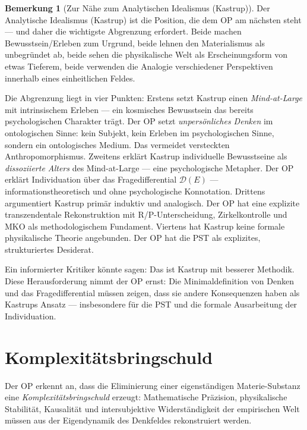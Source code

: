 \documentclass[11pt,a4paper]{article}
\theoremstyle{plain}
\theoremstyle{definition}
\newtheorem{remark}{Bemerkung}[section]
\begin{document}
\begin{remark}[Zur N\"{a}he zum Analytischen Idealismus (Kastrup)]
Der Analytische Idealismus (Kastrup) ist die Position, die dem OP am n\"{a}chsten steht
--- und daher die wichtigste Abgrenzung erfordert. Beide machen Bewusstsein/Erleben zum
Urgrund, beide lehnen den Materialismus als unbegr\"{u}ndet ab, beide sehen die
physikalische Welt als Erscheinungsform von etwas Tieferem, beide verwenden die Analogie
verschiedener Perspektiven innerhalb eines einheitlichen Feldes.

Die Abgrenzung liegt in vier Punkten: Erstens setzt Kastrup einen \emph{Mind-at-Large}
mit intrinsischem Erleben --- ein kosmisches Bewusstsein das bereits psychologischen
Charakter tr\"{a}gt. Der OP setzt \emph{unpersönliches Denken} im ontologischen Sinne:
kein Subjekt, kein Erleben im psychologischen Sinne, sondern ein ontologisches Medium.
Das vermeidet versteckten Anthropomorphismus. Zweitens erkl\"{a}rt Kastrup individuelle
Bewusstseine als \emph{dissoziierte Alters} des Mind-at-Large --- eine psychologische
Metapher. Der OP erkl\"{a}rt Individuation \"{u}ber das Fragedifferential $\mathcal{D}(E)$
--- informationstheoretisch und ohne psychologische Konnotation. Drittens argumentiert
Kastrup prim\"{a}r induktiv und analogisch. Der OP hat eine explizite transzendentale
Rekonstruktion mit R/P-Unterscheidung, Zirkelkontrolle und MKO als methodologischem
Fundament. Viertens hat Kastrup keine formale physikalische Theorie angebunden. Der OP
hat die PST als explizites, strukturiertes Desiderat.

Ein informierter Kritiker k\"{o}nnte sagen: \glqq{}Das ist Kastrup mit besserer
Methodik.\grqq{} Diese Herausforderung nimmt der OP ernst: Die Minimaldefinition von
\glqq{}Denken\grqq{} und das Fragedifferential m\"{u}ssen zeigen, dass sie andere
Konsequenzen haben als Kastrups Ansatz --- insbesondere f\"{u}r die PST und die formale
Ausarbeitung der Individuation.
\end{remark}

\section{Komplexit\"{a}tsbringschuld}

Der OP erkennt an, dass die Eliminierung einer eigenst\"{a}ndigen Materie-Substanz eine
\emph{Komplexit\"{a}tsbringschuld} erzeugt: Mathematische Pr\"{a}zision, physikalische
Stabilit\"{a}t, Kausalit\"{a}t und intersubjektive Widerst\"{a}ndigkeit der empirischen
Welt m\"{u}ssen aus der Eigendynamik des Denkfeldes rekonstruiert werden.
\end{document}
